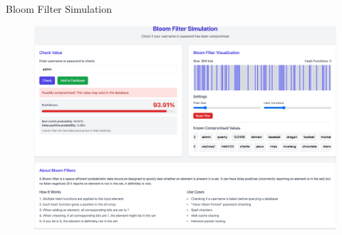 \begin{frame}{Bloom Filter Simulation}
  \begin{figure}[h]
    \centering
    \includegraphics[height=0.95\textheight]{./programs/bloom_filter_sim/bloom_filter_sim.png}
  \end{figure}
\end{frame}

